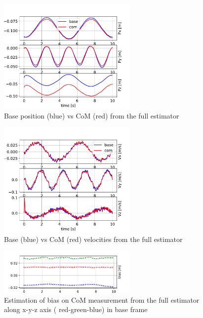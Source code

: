 \begin{figure}[h]
    \centering
    \includegraphics[width=0.6\textwidth]{figures/centroidal/com_position_povcdl_sin.pdf}
    \caption{Base position (blue) vs CoM (red) from the full estimator}
    \label{default}
\end{figure}

\begin{figure}[h]
    \centering
    \includegraphics[width=0.6\textwidth]{figures/centroidal/com_velocity_povcdl_sin.pdf}
    \caption{Base (blue) vs CoM (red) velocities   from the full estimator}
    \label{fig:com_base_vel}
\end{figure}


\begin{figure}[h]
    \centering
    \includegraphics[width=0.6\textwidth]{figures/centroidal/com_bias_est.pdf}
    \caption{Estimation of bias on CoM measurement from the full estimator along x-y-z axis ( red-green-blue) in base frame}
    \label{fig:bias_est}
\end{figure}

